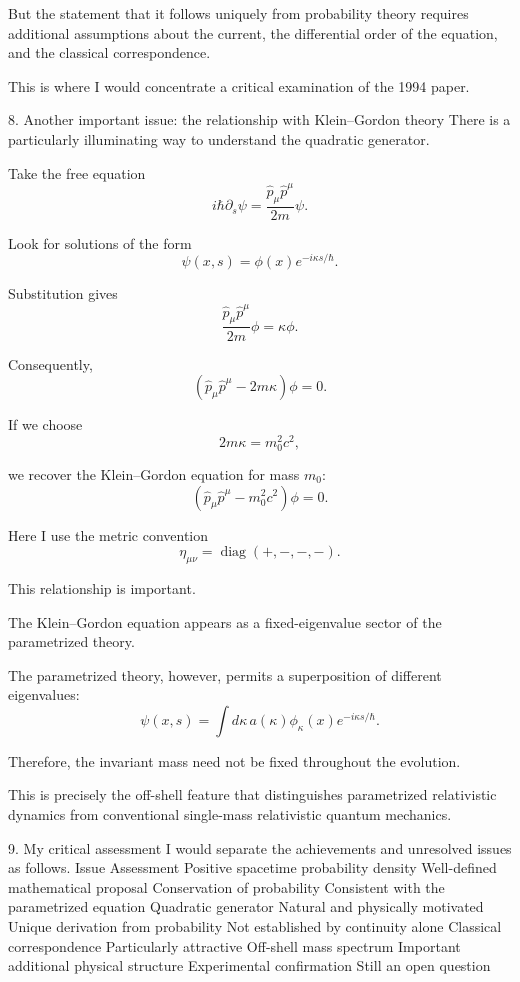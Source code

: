But the statement that it follows uniquely from probability theory requires additional assumptions about the current, the differential order of the equation, and the classical correspondence.

This is where I would concentrate a critical examination of the 1994 paper.

8. Another important issue: the relationship with Klein–Gordon theory
There is a particularly illuminating way to understand the quadratic generator.

Take the free equation
\[
i\hbar\partial_s\psi
=
\frac{\hat p_\mu\hat p^\mu}{2m}\psi.
\tag{26}
\]

Look for solutions of the form
\[
\psi(x,s)=\phi(x)e^{-i\kappa s/\hbar}.
\]

Substitution gives
\[
\frac{\hat p_\mu\hat p^\mu}{2m}\phi
=
\kappa\phi.
\]

Consequently,
\[
\boxed{
\left(
\hat p_\mu\hat p^\mu-2m\kappa
\right)\phi=0.
}
\tag{27}
\]

If we choose
\[
2m\kappa=m_0^2c^2,
\]

we recover the Klein–Gordon equation for mass \(m_0\):
\[
\boxed{
\left(
\hat p_\mu\hat p^\mu-m_0^2c^2
\right)\phi=0.
}
\tag{28}
\]

Here I use the metric convention
\[
\eta_{\mu\nu}=\operatorname{diag}(+,-,-,-).
\]

This relationship is important.

The Klein–Gordon equation appears as a fixed-eigenvalue sector of the parametrized theory.

The parametrized theory, however, permits a superposition of different eigenvalues:
\[
\psi(x,s)=
\int d\kappa\,
a(\kappa)\phi_\kappa(x)
e^{-i\kappa s/\hbar}.
\]

Therefore, the invariant mass need not be fixed throughout the evolution.

This is precisely the off-shell feature that distinguishes parametrized relativistic dynamics from conventional single-mass relativistic quantum mechanics.

9. My critical assessment
I would separate the achievements and unresolved issues as follows.
Issue	Assessment
Positive spacetime probability density	Well-defined mathematical proposal
Conservation of probability	Consistent with the parametrized equation
Quadratic generator	Natural and physically motivated
Unique derivation from probability	Not established by continuity alone
Classical correspondence	Particularly attractive
Off-shell mass spectrum	Important additional physical structure
Experimental confirmation	Still an open question

